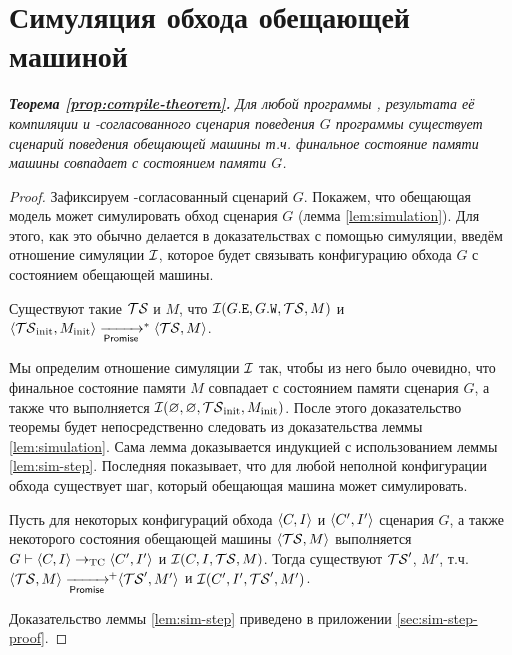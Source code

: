 \section{Симуляция обхода обещающей машиной}
\label{sec:simulation} 
\noindent
\emph{{\bf Теорема \ref {prop:compile-theorem}.}
  Для любой программы \Prog, результата её компиляции \ProgARM и \ARM-согласованного
  сценария поведения $G$ программы
  \ProgARM существует сценарий поведения обещающей машины т.ч. 
  финальное состояние памяти машины совпадает с состоянием памяти $G$.
}
\begin{proof}
  Зафиксируем \ARM-согласованный сценарий $G$.
Покажем, что обещающая модель может симулировать
  обход сценария $G$ (лемма \ref{lem:simulation}).
 Для этого, как это обычно делается в доказательствах с помощью симуляции, введём
  отношение симуляции $\mathcal{I}$, которое будет связывать конфигурацию обхода $G$ с состоянием обещающей машины.
  
\begin{lemma}
  \label{lem:simulation}
  Существуют такие $\mathcal{TS}$ и $M$, что $\mathcal{I}(G.{\mathtt{E}}, G.{\mathtt{W}}, \mathcal{TS}, M)$ и
  $\tup{\TSf_{\rm init}, M_{\rm init}} \stepp^{*} \tup{\TSf, M}$.
\end{lemma}
  Мы определим отношение симуляции $\mathcal{I}$ так, чтобы из него было очевидно, что финальное состояние памяти
  $M$ совпадает с состоянием памяти сценария $G$, а также что выполняется $\mathcal{I}(\varnothing, \varnothing, \mathcal{TS}_{\rm init}, M_{\rm init})$.
   После этого доказательство теоремы будет непосредственно следовать из доказательства леммы \ref{lem:simulation}.
Сама лемма доказывается индукцией с использованием леммы \ref{lem:sim-step}. Последняя показывает,
  что для любой неполной конфигурации обхода существует шаг, который обещающая машина может симулировать. 
\begin{lemma}
  \label{lem:sim-step}
  Пусть для некоторых конфигураций обхода ${\langle{C, I}\rangle}$ и ${\langle{C', I'}\rangle}$ сценария $G$,
  а также некоторого состояния обещающей машины ${\langle{\ensuremath{\mathcal{TS}}, M}\rangle}$ выполняется
  $G \vdash {\langle{C, I}\rangle} \rightarrow_{\rm TC} {\langle{C', I'}\rangle}$ и
  $\mathcal{I}(C, I, \mathcal{TS}, M)$.
  Тогда существуют $\mathcal{TS}'$, $M'$, т.ч. $\tup{\TSf, M} \stepp\!\!^{+} \tup{\TSf', M'}$ и
  $\mathcal{I}(C', I', \mathcal{TS}', M')$.
\end{lemma}
  Доказательство леммы \ref{lem:sim-step} приведено в приложении \ref{sec:sim-step-proof}.
\end{proof}
  
